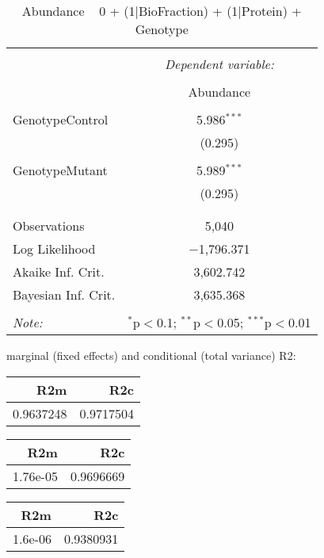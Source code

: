 \documentclass[11pt]{report}
\begin{document}
\begin{table}[!htbp] \centering 
  \caption{Abundance ~ 0 + (1|BioFraction) + (1|Protein) + Genotype} 
  \label{} 
\begin{tabular}{@{\extracolsep{5pt}}lc} 
\\[-1.8ex]\hline 
\hline \\[-1.8ex] 
 & \multicolumn{1}{c}{\textit{Dependent variable:}} \\ 
\cline{2-2} 
\\[-1.8ex] & Abundance \\ 
\hline \\[-1.8ex] 
 GenotypeControl & 5.986$^{***}$ \\ 
  & (0.295) \\ 
  & \\ 
 GenotypeMutant & 5.989$^{***}$ \\ 
  & (0.295) \\ 
  & \\ 
\hline \\[-1.8ex] 
Observations & 5,040 \\ 
Log Likelihood & $-$1,796.371 \\ 
Akaike Inf. Crit. & 3,602.742 \\ 
Bayesian Inf. Crit. & 3,635.368 \\ 
\hline 
\hline \\[-1.8ex] 
\textit{Note:}  & \multicolumn{1}{r}{$^{*}$p$<$0.1; $^{**}$p$<$0.05; $^{***}$p$<$0.01} \\ 
\end{tabular} 
\end{table} 
marginal (fixed effects) and conditional (total variance) R2:

\begin{tabular}{r|r}
\hline
R2m & R2c\\
\hline
0.9637248 & 0.9717504\\
\hline
\end{tabular}

\begin{tabular}{r|r}
\hline
R2m & R2c\\
\hline
1.76e-05 & 0.9696669\\
\hline
\end{tabular}

\begin{tabular}{r|r}
\hline
R2m & R2c\\
\hline
1.6e-06 & 0.9380931\\
\hline
\end{tabular}
\end{document}
